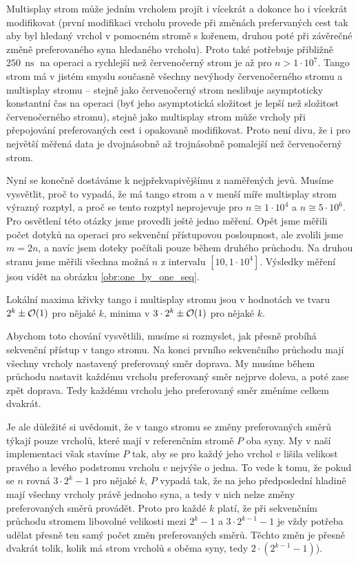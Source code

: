Multisplay strom může jedním vrcholem projít i vícekrát a dokonce
ho i vícekrát modifikovat (první modifikaci vrcholu provede při změnách
prefervaných cest tak aby byl hledaný vrchol v pomocném stromě s kořenem,
druhou poté při závěrečné změně preferovaného syna hledaného vrcholu). Proto
také potřebuje přibližně $250\,\operatorname{ns}$ na operaci a rychlejší než
červenočerný strom je až pro $n>1\cdot 10^7$. Tango strom má v jistém smyslu
současně všechny nevýhody červenočerného stromu a multisplay stromu -- stejně
jako červenočerný strom neslibuje asymptoticky konstantní čas na operaci (byť
jeho asymptotická složitost je lepší než složitost červenočerného stromu),
stejně jako multisplay strom může vrcholy při přepojování preferovaných cest i
opakovaně modifikovat. Proto není divu, že i pro největší měřená data je
dvojnásobně až trojnásobně pomalejší než červenočerný strom.

Nyní se konečně dostáváme k nejpřekvapivějšímu z naměřených jevů. Musíme
vysvětlit, proč to vypadá, že má tango strom a v menší míře multisplay strom
výrazný rozptyl, a proč se tento rozptyl neprojevuje pro $n\cong 1\cdot 10^4$ a
$n\cong 5\cdot10^6$. Pro osvětlení této otázky jsme provedli ještě jedno
měření. Opět jsme měřili počet dotyků na operaci pro sekvenční přístupovou
posloupnost, ale zvolili jsme $m=2n$, a navíc jsem doteky počítali pouze během
druhého průchodu. Na druhou stranu jsme měřili všechna možná $n$ z intervalu
$[10, 1\cdot10^4]$. Výsledky měření jsou vidět na obrázku
\ref{obr:one_by_one_seq}.


Lokální maxima křivky tango i multisplay stromu jsou v hodnotách ve tvaru $2^k \pm \mathcal O(1)$ pro nějaké $k$, minima v $3\cdot 2^k\pm \mathcal O(1)$ pro nějaké $k$. 

Abychom toto chování vysvětlili, musíme si rozmyslet, jak přesně probíhá
sekvenční přístup v tango stromu. Na konci prvního sekvenčního průchodu mají
všechny vrcholy nastavený preferovaný směr doprava. My musíme během průchodu
nastavit každému vrcholu preferovaný směr nejprve doleva, a poté zase zpět
doprava. Tedy každému vrcholu jeho preferovaný směr změníme celkem dvakrát.

Je ale důležité si uvědomit, že v tango stromu se změny preferovaných směrů
týkají pouze vrcholů, které mají v referenčním stromě $P$ oba syny. My v naší
implementaci však stavíme $P$ tak, aby se pro každý jeho vrchol $v$ lišila
velikost pravého a levého podstromu vrcholu $v$ nejvýše o jedna. To vede k tomu, že pokud se
$n$ rovná $3\cdot2^k-1$ pro nějaké $k$, $P$ vypadá tak, že na jeho předposlední
hladině mají všechny vrcholy právě jednoho syna, a tedy v nich nelze změny
preferovaných směrů provádět. Proto pro každé $k$ platí, že při sekvenčním
průchodu stromem libovolné velikosti mezi $2^k-1$ a $3\cdot 2^{k-1}-1$ je vždy
potřeba udělat přesně ten samý počet změn preferovaných směrů. Těchto změn je přesně
dvakrát tolik, kolik má strom vrcholů s oběma syny, tedy $2\cdot(2^{k-1} -1)$).

